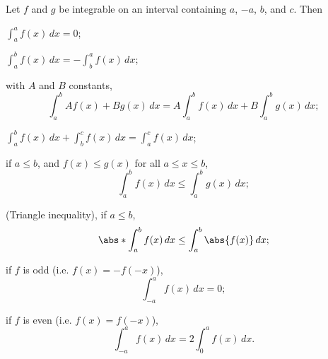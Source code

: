 \begin{theorem}
	Let $f$ and $g$ be integrable on an interval containing $a$, $-a$, $b$, and $c$. Then
	\begin{romanlist}
		\item $\displaystyle \int_a^a f(x) \, d x = 0$;
		\item $\displaystyle \int_a^b f(x) \, d x = - \int_b^a f(x) \, d x$;
		\item with $A$ and $B$ constants,
		\[
			\int_a^b A f(x) + B g(x) \, d x = A \int_a^b f(x) \, d x + B \int_a^b g(x) \, d x;
		\]
		\item $\displaystyle \int_a^b f(x) \, d x + \int_b^c f(x) \, d x = \int_a^c f(x) \, d x$;
		\item if $a \leq b$, and $f(x) \leq g(x)$ for all $a \leq x \leq b$,
		\[
			\int_a^b f(x) \, d x \leq \int_a^b g(x) \, d x;
		\]
		\item (Triangle inequality), if $a \leq b$,
		\[
			\abs*{\int_a^b f(x) \, d x} \leq \int_a^b \abs{f(x)} \, d x;
		\]
		\item if $f$ is odd (i.e. $f(x) = - f(-x)$),
		\[
			\int_{-a}^a f(x) \, d x = 0;
		\]
		\item if $f$ is even  (i.e. $f(x) = f(-x)$),
		\[
			\int_{-a}^a f(x) \, d x = 2 \int_0^a f(x) \, d x.
		\]
	\end{romanlist}
\end{theorem}

